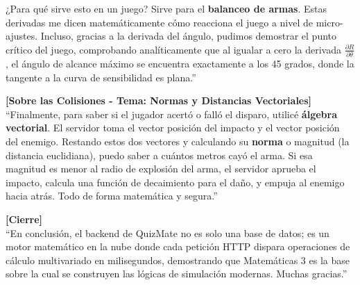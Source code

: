 \documentclass[12pt,a4paper]{article}
\begin{document}
¿Para qué sirve esto en un juego? Sirve para el \textbf{balanceo de armas}. Estas derivadas me dicen matemáticamente cómo reacciona el juego a nivel de micro-ajustes. Incluso, gracias a la derivada del ángulo, pudimos demostrar el punto crítico del juego, comprobando analíticamente que al igualar a cero la derivada $\frac{\partial R}{\partial \theta}$, el ángulo de alcance máximo se encuentra exactamente a los 45 grados, donde la tangente a la curva de sensibilidad es plana.''

\vspace{0.5cm}
\textbf{[Sobre las Colisiones - Tema: Normas y Distancias Vectoriales]} \\
``Finalmente, para saber si el jugador acertó o falló el disparo, utilicé \textbf{álgebra vectorial}. El servidor toma el vector posición del impacto y el vector posición del enemigo. Restando estos dos vectores y calculando su \textbf{norma} o magnitud (la distancia euclidiana), puedo saber a cuántos metros cayó el arma. Si esa magnitud es menor al radio de explosión del arma, el servidor aprueba el impacto, calcula una función de decaimiento para el daño, y empuja al enemigo hacia atrás. Todo de forma matemática y segura.''

\vspace{0.5cm}
\textbf{[Cierre]} \\
``En conclusión, el backend de QuizMate no es solo una base de datos; es un motor matemático en la nube donde cada petición HTTP dispara operaciones de cálculo multivariado en milisegundos, demostrando que Matemáticas 3 es la base sobre la cual se construyen las lógicas de simulación modernas. Muchas gracias.''
\end{document}
